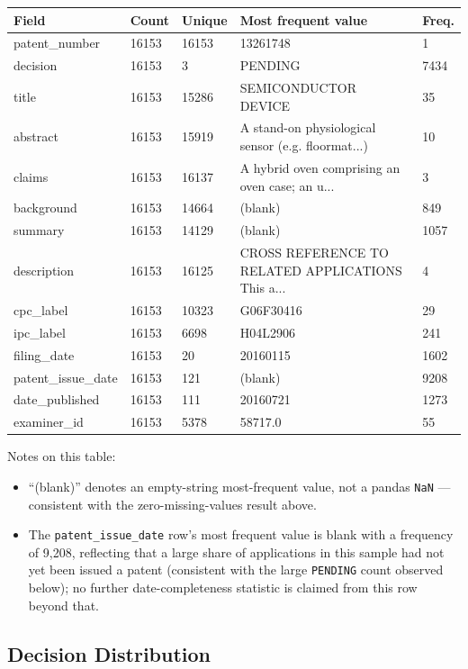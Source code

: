 \documentclass[11pt]{article}
\begin{document}
\begin{longtable}{|p{2.6cm}|p{0.9cm}|p{1.1cm}|p{6.2cm}|p{1.2cm}|}
\hline
\textbf{Field} & \textbf{Count} & \textbf{Unique} & \textbf{Most frequent value} & \textbf{Freq.} \\
\hline
\endhead
patent\_number & 16153 & 16153 & 13261748 & 1 \\ \hline
decision & 16153 & 3 & PENDING & 7434 \\ \hline
title & 16153 & 15286 & SEMICONDUCTOR DEVICE & 35 \\ \hline
abstract & 16153 & 15919 & A stand-on physiological sensor (e.g. floormat...) & 10 \\ \hline
claims & 16153 & 16137 & A hybrid oven comprising an oven case; an u... & 3 \\ \hline
background & 16153 & 14664 & (blank) & 849 \\ \hline
summary & 16153 & 14129 & (blank) & 1057 \\ \hline
description & 16153 & 16125 & CROSS REFERENCE TO RELATED APPLICATIONS This a... & 4 \\ \hline
cpc\_label & 16153 & 10323 & G06F30416 & 29 \\ \hline
ipc\_label & 16153 & 6698 & H04L2906 & 241 \\ \hline
filing\_date & 16153 & 20 & 20160115 & 1602 \\ \hline
patent\_issue\_date & 16153 & 121 & (blank) & 9208 \\ \hline
date\_published & 16153 & 111 & 20160721 & 1273 \\ \hline
examiner\_id & 16153 & 5378 & 58717.0 & 55 \\ \hline
\end{longtable}

\noindent Notes on this table:

\begin{itemize}
    \item ``(blank)'' denotes an empty-string most-frequent value, not a pandas \texttt{NaN} --- consistent with the zero-missing-values result above.
    \item The \texttt{patent\_issue\_date} row's most frequent value is blank with a frequency of 9,208, reflecting that a large share of applications in this sample had not yet been issued a patent (consistent with the large \texttt{PENDING} count observed below); no further date-completeness statistic is claimed from this row beyond that.
\end{itemize}

\subsection{Decision Distribution}
\end{document}
